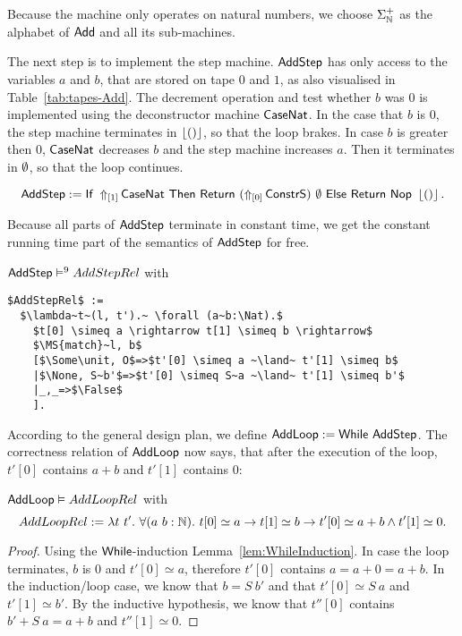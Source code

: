 Because the machine only operates on natural numbers, we choose $\Sigma_\Nat^+$ as the alphabet of $\MS{Add}$ and all its sub-machines.

The next step is to implement the step machine.  $\MS{AddStep}$ has only access to the variables $a$ and $b$, that are stored on tape $0$ and $1$, as
also visualised in Table~\ref{tab:tapes-Add}.  The decrement operation and test whether $b$ was $0$ is implemented using the deconstructor machine
$\MS{CaseNat}$.  In the case that $b$ is $0$, the step machine terminates in $\Some\unit$, so that the loop brakes.  In case $b$ is greater then $0$,
$\MS{CaseNat}$ decreases $b$ and the step machine increases $a$.  Then it terminates in $\None$, so that the loop continues.
\begin{definition}
  \label{def:Add_Step}
  \[
    \MS{AddStep} := \If{\LiftTapes{\MS{CaseNat}}{\Vector{1}}}{\Return{(\LiftTapes{\MS{ConstrS}}{\Vector{0}})}{\None}}{\Return{\Nop}{\Some\unit}}.
  \]
\end{definition}

Because all parts of $\MS{AddStep}$ terminate in constant time, we get the constant running time part of the semantics of $\MS{AddStep}$ for free.
\begin{lemma}
  \label{lem:Add_Step_Sem}
  $\MS{AddStep} \RealiseIn{9} AddStepRel$ with
\begin{lstlisting}[style=semicoqstyle]
$AddStepRel$ :=
  $\lambda~t~(l, t').~ \forall (a~b:\Nat).$
    $t[0] \simeq a \rightarrow t[1] \simeq b \rightarrow$
    $\MS{match}~l, b$
    [$\Some\unit, O$=>$t'[0] \simeq a ~\land~ t'[1] \simeq b$
    |$\None, S~b'$=>$t'[0] \simeq S~a ~\land~ t'[1] \simeq b'$
    |_,_=>$\False$
    ].
\end{lstlisting}
\end{lemma}

According to the general design plan, we define $\MS{AddLoop} := \While~\MS{AddStep}$.  The correctness relation of $\MS{AddLoop}$ now says, that
after the execution of the loop, $t'[0]$ contains $a+b$ and $t'[1]$ contains $0$:
\begin{lemma}
  \label{lem:Add_Loop_Realise}
  $\MS{AddLoop} \Realise AddLoopRel$ with
  \[
    AddLoopRel := \lambda t~t'.~\forall (a~b:\Nat).~t[0] \simeq a \rightarrow t[1] \simeq b \rightarrow t'[0] \simeq a+b \land t'[1] \simeq 0.
  \]
\end{lemma}
\begin{proof}
  Using the $\While$-induction Lemma~\ref{lem:WhileInduction}.  In case the loop terminates, $b$ is $0$ and $t'[0] \simeq a$, therefore $t'[0]$
  contains $a=a+0=a+b$.  In the induction/loop case, we know that $b=S~b'$ and that $t'[0] \simeq S~a$ and $t'[1] \simeq b'$.  By the inductive
  hypothesis, we know that $t''[0]$ contains $b' + S~a = a+b$ and $t''[1] \simeq 0$.
\end{proof}

